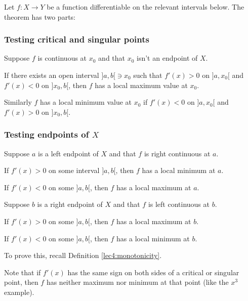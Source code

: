 \begin{theorem}
	Let $f \colon X \to Y$ be a function differentiable on the relevant intervals below.
	The theorem has two parts:

	\subsubsection*{Testing critical and singular points}

	Suppose $f$ is continuous at $x_0$ and that $x_0$ isn't an endpoint of $X$.
	\begin{romanlist}
		\item If there exists an open interval ${]{a, b}[} \ni x_0$ such that $f'(x) > 0$ on ${]{a, x_0}[}$ and $f'(x) < 0$ on ${]{x_0, b}[}$, then $f$ has a local maximum value at $x_0$.
		\item Similarly $f$ has a local minimum value at $x_0$ if $f'(x) < 0$ on ${]{a, x_0}[}$ and $f'(x) > 0$ on ${]{x_0, b}[}$.
	\end{romanlist}

	\subsubsection*{Testing endpoints of $X$}

	Suppose $a$ is a left endpoint of $X$ and that $f$ is right continuous at $a$.
	\begin{romanlist}
		\setcounter{enumi}{2}
		\item If $f'(x) > 0$ on some interval ${]{a, b}[}$, then $f$ has a local minimum at $a$.
		\item If $f'(x) < 0$ on some ${]{a, b}[}$, then $f$ has a local maximum at $a$.
	\end{romanlist}
	Suppose $b$ is a right endpoint of $X$ and that $f$ is left continuous at $b$.
	\begin{romanlist}
		\setcounter{enumi}{4}
		\item If $f'(x) > 0$ on some ${]{a, b}[}$, then $f$ has a local maximum at $b$.
		\item If $f'(x) < 0$ on some ${]{a, b}[}$, then $f$ has a local minimum at $b$.
	\end{romanlist}
\end{theorem}

\begin{exercise}
	To prove this, recall Definition \ref{lec4:monotonicity}.
\end{exercise}

\noindent
Note that if $f'(x)$ has the same sign on both sides of a critical or singular point, then $f$ has neither maximum nor minimum at that point (like the $x^3$ example).

